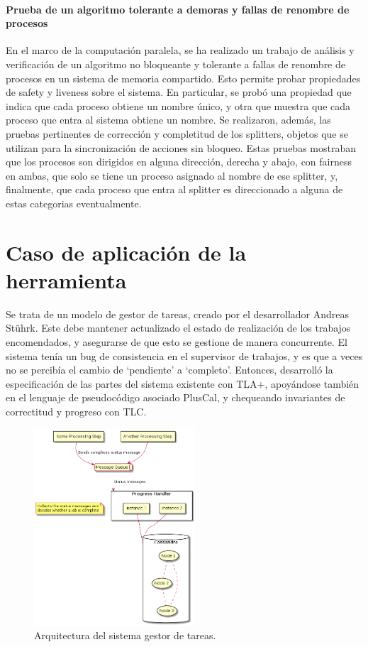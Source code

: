 \documentclass[runningheads]{llncs}
\begin{document}
\paragraph{Prueba de un algoritmo tolerante a demoras y fallas de renombre de procesos}
En el marco de la computación paralela, se ha realizado un trabajo de análisis y verificación de un algoritmo no bloqueante y tolerante a fallas de renombre de procesos en un sistema de memoria compartido. Esto permite probar propiedades de safety y liveness sobre el sistema. En particular, se probó una propiedad que indica que cada proceso obtiene un nombre único, y otra que muestra que cada proceso que entra al sistema obtiene un nombre. Se realizaron, además, las pruebas pertinentes de corrección y completitud de los splitters, objetos que se utilizan para la sincronización de acciones sin bloqueo. Estas pruebas mostraban que los procesos son dirigidos en alguna dirección, derecha y abajo, con fairness en ambas, que solo se tiene un proceso asignado al nombre de ese splitter, y, finalmente, que cada proceso que entra al splitter es direccionado a alguna de estas categorias eventualmente.

\section{Caso de aplicación de la herramienta}
Se trata de un modelo de gestor de tareas, creado por el desarrollador Andreas Stührk. Este debe mantener actualizado el estado de realización de los trabajos encomendados, y asegurarse de que esto se gestione de manera concurrente. El sistema tenía un bug de consistencia en el supervisor de trabajos, y es que a veces no se percibía el cambio de ‘pendiente’ a ‘completo’. Entonces, desarrolló la especificación de las partes del sistema existente con TLA+, apoyándose también en el lenguaje de pseudocódigo asociado PlusCal, y chequeando invariantes de correctitud y progreso con TLC.

\begin{figure}
    \centering
    \includegraphics[width=6cm]{formalizing-the-system.png}
    \caption{Arquitectura del sistema gestor de tareas.}
    \label{caso_estudio}
\end{figure}
\end{document}
